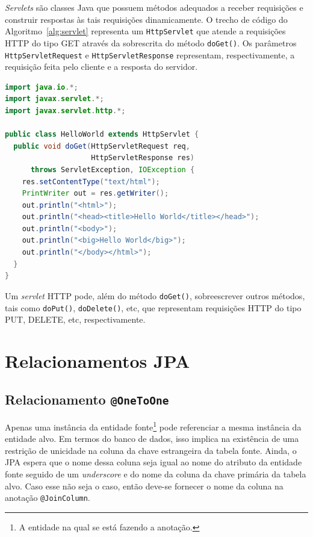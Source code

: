 \documentclass[
  10.5pt,				  %
	openright,			%
	twoside,			  %
  a5paper,
  chapter=TITLE,	%
	section=TITLE,	%
  hyphens,        %
	english,        %
	brazil          %
]{abntex2}
\begin{document}
\emph{Servlets} são classes Java que possuem métodos adequados a receber requisições e construir respostas às tais requisições dinamicamente. O trecho de código do Algoritmo~\ref{alg:servlet} representa um \texttt{HttpServlet} que atende a requisições HTTP do tipo GET através da sobrescrita do método \texttt{doGet()}. Os parâmetros \texttt{HttpServletRequest} e \texttt{HttpServletResponse} representam, respectivamente, a requisição feita pelo cliente e a resposta do servidor.
%
\begin{lstlisting}[language=Java, caption={Um \emph{servlet} que imprime ``\emph{Hello World}''.}, label={alg:servlet}]
import java.io.*;
import javax.servlet.*;
import javax.servlet.http.*;

public class HelloWorld extends HttpServlet {
  public void doGet(HttpServletRequest req,
                    HttpServletResponse res)
      throws ServletException, IOException {
    res.setContentType("text/html");
    PrintWriter out = res.getWriter();
    out.println("<html>");
    out.println("<head><title>Hello World</title></head>");
    out.println("<body>");
    out.println("<big>Hello World</big>");
    out.println("</body></html>");
  }
}
\end{lstlisting}

Um \emph{servlet} HTTP pode, além do método \texttt{doGet()}, sobreescrever outros métodos, tais como \texttt{doPut()}, \texttt{doDelete()}, etc, que representam requisições HTTP do tipo PUT, DELETE, etc, respectivamente.



\chapter{Relacionamentos JPA}\label{anexo:jpa}


\section{Relacionamento \texttt{@OneToOne}}
Apenas uma instância da entidade fonte\footnote{A entidade na qual se está fazendo a anotação.} pode referenciar a mesma instância da entidade alvo. Em termos do banco de dados, isso implica na existência de uma restrição de unicidade na coluna da chave estrangeira da tabela fonte. Ainda, o JPA espera que o nome dessa coluna seja igual ao nome do atributo da entidade fonte seguido de um \emph{underscore} e do nome da coluna da chave primária da tabela alvo. Caso esse não seja o caso, então deve-se fornecer o nome da coluna na anotação \texttt{@JoinColumn}.
\end{document}
